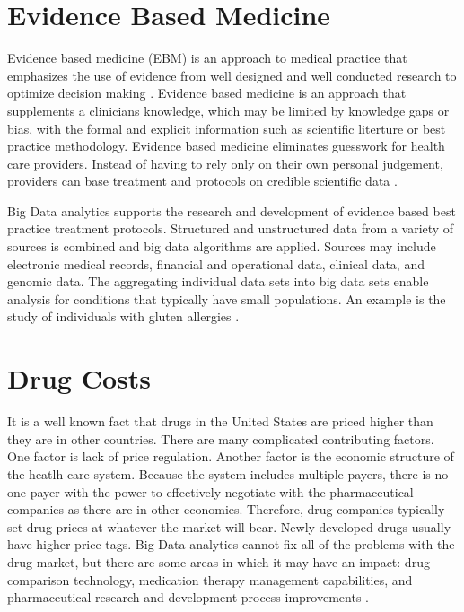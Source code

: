 \documentclass[sigconf]{acmart}
\begin{document}
{\section{Evidence Based Medicine}

Evidence based medicine (EBM) is an approach to medical practice that emphasizes the use of evidence from well designed and well conducted research to optimize decision making \cite{www-google-wikievi}.  Evidence based medicine is an approach that supplements a clinicians knowledge, which may be limited by knowledge gaps or bias, with the formal and explicit information such as scientific literture or best practice methodology. Evidence based medicine eliminates guesswork for health care providers. Instead of having to rely only on their own personal judgement, providers can base treatment and protocols on credible scientific data \cite{www-google-christian}.

Big Data analytics supports the research and development of evidence based best practice treatment protocols.  Structured and unstructured data from a variety of sources is combined and big data algorithms are applied. Sources may include electronic medical records, financial and operational data, clinical data, and genomic data. The aggregating individual data sets into big data sets  enable analysis for conditions that typically have small populations.  An example is the study of individuals with gluten allergies \cite{www-google-McKinsey}.
 
\section{Drug Costs}
It is a well known fact that drugs in the United States are priced higher than they are in other countries.  There are many complicated contributing factors. One factor is lack of price regulation. Another factor is the economic structure of the heatlh care system.  Because the system includes multiple payers, there is no one payer with the power to effectively negotiate with the pharmaceutical companies as there are in other economies. Therefore, drug companies typically set drug prices at whatever the market will bear.  Newly developed drugs usually have higher price tags.  Big Data analytics cannot fix all of the problems with the drug market, but there are some areas in which it may have an impact:  drug comparison technology, medication therapy management capabilities, and pharmaceutical research and development process improvements \cite{www-google-drug}.

}
\end{document}
